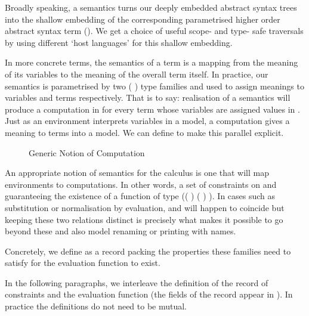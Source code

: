 Broadly speaking, a semantics turns our deeply embedded abstract syntax
trees into the shallow embedding of the corresponding parametrised higher
order abstract syntax term (\cite{chlipala2008parametric}). We get a
choice of useful scope- and type- safe traversals by using different `host
languages' for this shallow embedding.

In more concrete terms, the semantics of a term is a mapping from the
meaning of its variables to the meaning of the overall term itself.
In practice, our semantics is parametrised by two ( )
type families  and  used to assign meanings to variables
and terms respectively.
%
That is to say: realisation of a semantics will produce a computation
in  for every term whose variables are assigned values in .
Just as an environment interprets variables in a model, a computation
gives a meaning to terms into a model. We can define  to make
this parallel explicit.

\begin{figure}[h]
\caption{Generic Notion of Computation\label{fig:comp}}
\end{figure}

An appropriate notion of semantics for the calculus is one that will
map environments to computations. In other words, a set of constraints on
 and  guaranteeing the existence of a function of type
(( )    ( )  ).
In cases such as substitution or normalisation by evaluation,
 and  will happen to coincide but keeping these two relations
distinct is precisely what makes it possible to go beyond these and
also model renaming or printing with names.

Concretely, we define  as a record packing the properties
these families need to satisfy for the evaluation function 
to exist.

\begin{AgdaSuppressSpace}
\end{AgdaSuppressSpace}

In the following paragraphs, we interleave the definition of the record of
constraints \semrec{} and the evaluation function  (the fields
of the record appear in ). In practice the definitions do not need
to be mutual.

